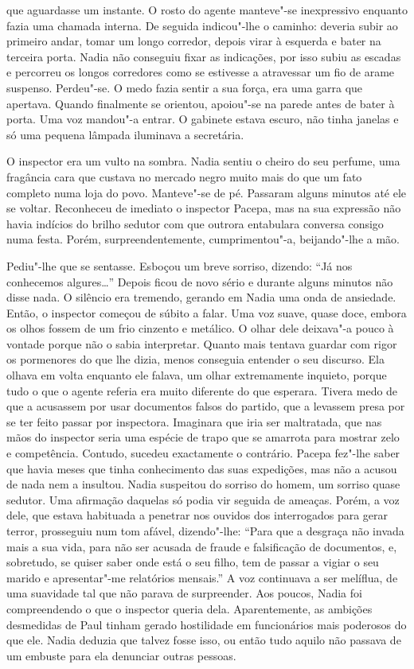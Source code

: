 que aguardasse um instante. O rosto do agente manteve"-se inexpressivo
enquanto fazia uma chamada interna. De seguida indicou"-lhe o caminho:
deveria subir ao primeiro andar, tomar um longo corredor, depois virar à
esquerda e bater na terceira porta. Nadia não conseguiu fixar as indicações, por isso subiu as escadas e percorreu os longos corredores como
se estivesse a atravessar um fio de arame suspenso. Perdeu"-se. O medo
fazia sentir a sua força, era uma garra que apertava. Quando finalmente
se orientou, apoiou"-se na parede antes de bater à porta. Uma voz
mandou"-a entrar. O gabinete estava escuro, não tinha janelas e só uma
pequena lâmpada iluminava a secretária.

O inspector era um vulto na sombra. Nadia sentiu o cheiro do seu
perfume, uma fragância cara que custava no mercado negro muito mais do
que um fato completo numa loja do povo. Manteve"-se de pé. Passaram
alguns minutos até ele se voltar. Reconheceu de imediato o inspector
Pacepa, mas na sua expressão não havia indícios do brilho sedutor com
que outrora entabulara conversa consigo numa festa. Porém,
surpreendentemente, cumprimentou"-a, beijando"-lhe a mão.

Pediu"-lhe que se sentasse. Esboçou um breve sorriso, dizendo: ``Já nos
conhecemos algures\ldots{}'' Depois ficou de novo sério e durante alguns
minutos não disse nada. O silêncio era tremendo, gerando em Nadia uma
onda de ansiedade. Então, o inspector começou de súbito a falar. Uma voz
suave, quase doce, embora os olhos fossem de um frio cinzento e
metálico. O olhar dele deixava"-a pouco à vontade porque não o sabia
interpretar. Quanto mais tentava guardar com rigor os pormenores do
que lhe dizia, menos conseguia entender o seu discurso. Ela olhava em
volta enquanto ele falava, um olhar extremamente inquieto, porque tudo o
que o agente referia era muito diferente do que esperara. Tivera medo de
que a acusassem por usar documentos falsos do partido, que a levassem
presa por se ter feito passar por inspectora. Imaginara que iria ser
maltratada, que nas mãos do inspector seria uma espécie de trapo que se
amarrota para mostrar zelo e competência. Contudo, sucedeu exactamente
o contrário. Pacepa fez"-lhe saber que havia meses que tinha conhecimento das suas expedições, mas não a acusou de nada nem a insultou.
Nadia suspeitou do sorriso do homem, um sorriso quase sedutor. Uma
afirmação daquelas só podia vir seguida de ameaças. Porém, a voz dele,
que estava habituada a penetrar nos ouvidos dos interrogados para
gerar terror, prosseguiu num tom afável, dizendo"-lhe: ``Para que a
desgraça não invada mais a sua vida, para não ser acusada de fraude e
falsificação de documentos, e, sobretudo, se quiser saber onde está o
seu filho, tem de passar a vigiar o seu marido e apresentar"-me
relatórios mensais.'' A voz continuava a ser melíflua, de uma suavidade
tal que não parava de surpreender. Aos poucos, Nadia foi compreendendo
o que o inspector queria dela. Aparentemente, as ambições desmedidas de
Paul tinham gerado hostilidade em funcionários mais poderosos do que
ele. Nadia deduzia que talvez fosse isso, ou então tudo aquilo não
passava de um embuste para ela denunciar outras pessoas.

